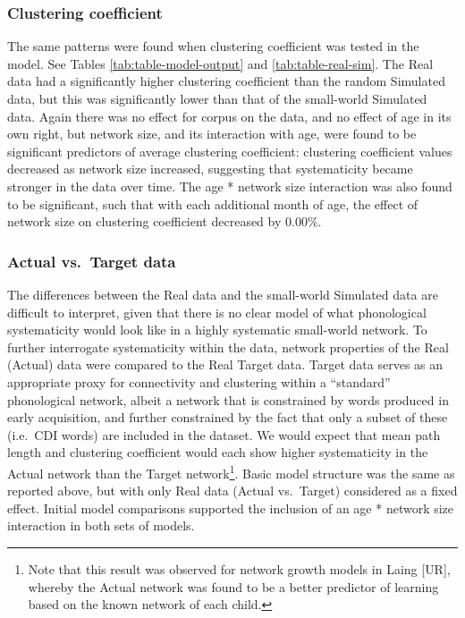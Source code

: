 \documentclass[
  man]{apa6}
\begin{document}
\hypertarget{clustering-coefficient}{%
\subsubsection{Clustering coefficient}\label{clustering-coefficient}}

The same patterns were found when clustering coefficient was tested in the model. See Tables \ref{tab:table-model-output} and \ref{tab:table-real-sim}. The Real data had a significantly higher clustering coefficient than the random Simulated data, but this was significantly lower than that of the small-world Simulated data. Again there was no effect for corpus on the data, and no effect of age in its own right, but network size, and its interaction with age, were found to be significant predictors of average clustering coefficient: clustering coefficient values decreased as network size increased, suggesting that systematicity became stronger in the data over time. The age * network size interaction was also found to be significant, such that with each additional month of age, the effect of network size on clustering coefficient decreased by 0.00\%.

\hypertarget{actual-vs.-target-data}{%
\subsubsection{Actual vs.~Target data}\label{actual-vs.-target-data}}

The differences between the Real data and the small-world Simulated data are difficult to interpret, given that there is no clear model of what phonological systematicity would look like in a highly systematic small-world network. To further interrogate systematicity within the data, network properties of the Real (Actual) data were compared to the Real Target data. Target data serves as an appropriate proxy for connectivity and clustering within a ``standard'' phonological network, albeit a network that is constrained by words produced in early acquisition, and further constrained by the fact that only a subset of these (i.e.~CDI words) are included in the dataset. We would expect that mean path length and clustering coefficient would each show higher systematicity in the Actual network than the Target network\footnote{Note that this result was observed for network growth models in Laing {[}UR{]}, whereby the Actual network was found to be a better predictor of learning based on the known network of each child.}. Basic model structure was the same as reported above, but with only Real data (Actual vs.~Target) considered as a fixed effect. Initial model comparisons supported the inclusion of an age * network size interaction in both sets of models.
\end{document}

